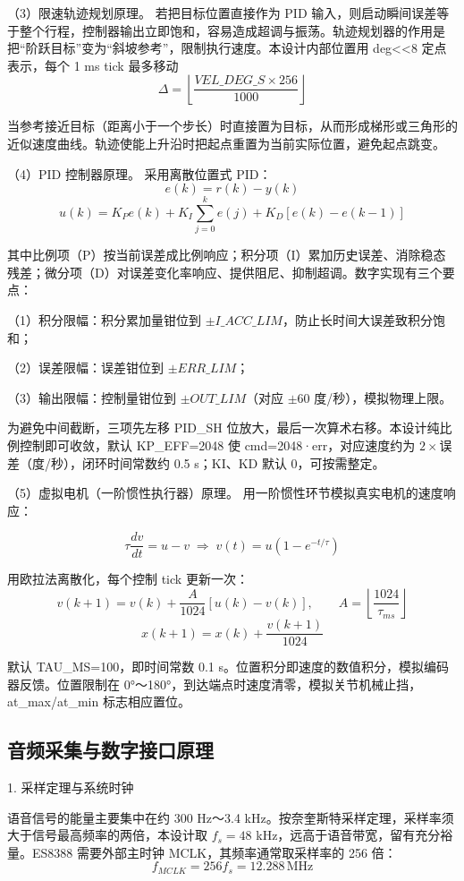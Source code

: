 \documentclass[UTF8,zihao=-4,fontset=windows]{ctexart}
\newcommand{\code}[1]{{\ttfamily #1}}
\newcommand{\subhead}[1]{%
  \par\medskip
  {\heiti\zihao{-4}#1}
  \nopagebreak
  \par\smallskip
}
\begin{document}
{\heiti（3）限速轨迹规划原理。} 若把目标位置直接作为 PID 输入，则启动瞬间误差等于整个行程，控制器输出立即饱和，容易造成超调与振荡。轨迹规划器的作用是把“阶跃目标”变为“斜坡参考”，限制执行速度。本设计内部位置用 \code{deg<<8} 定点表示，每个 1 ms tick 最多移动
\[
\Delta=\left\lfloor\frac{VEL\_DEG\_S\times 256}{1000}\right\rfloor
\]

当参考接近目标（距离小于一个步长）时直接置为目标，从而形成梯形或三角形的近似速度曲线。轨迹使能上升沿时把起点重置为当前实际位置，避免起点跳变。

{\heiti（4）PID 控制器原理。} 采用离散位置式 PID：
\[
e(k)=r(k)-y(k)
\]
\[
u(k)=K_Pe(k)+K_I\sum_{j=0}^{k}e(j)+K_D[e(k)-e(k-1)]
\]

其中比例项（P）按当前误差成比例响应；积分项（I）累加历史误差、消除稳态残差；微分项（D）对误差变化率响应、提供阻尼、抑制超调。数字实现有三个要点：

{\heiti（1）}积分限幅：积分累加量钳位到 $\pm I\_ACC\_LIM$，防止长时间大误差致积分饱和；

{\heiti（2）}误差限幅：误差钳位到 $\pm ERR\_LIM$；

{\heiti（3）}输出限幅：控制量钳位到 $\pm OUT\_LIM$（对应 $\pm 60$ 度/秒），模拟物理上限。

为避免中间截断，三项先左移 \code{PID\_SH} 位放大，最后一次算术右移。本设计纯比例控制即可收敛，默认 \code{KP\_EFF}=2048 使 \code{cmd}=2048·\code{err}，对应速度约为 $2\times$误差（度/秒），闭环时间常数约 0.5 s；\code{KI}、\code{KD} 默认 0，可按需整定。

{\heiti（5）虚拟电机（一阶惯性执行器）原理。} 用一阶惯性环节模拟真实电机的速度响应：

\[
\tau\frac{dv}{dt}=u-v \;\Rightarrow\; v(t)=u\left(1-e^{-t/\tau}\right)
\]

用欧拉法离散化，每个控制 tick 更新一次：
\[
v(k+1)=v(k)+\frac{A}{1024}\left[u(k)-v(k)\right],\qquad A=\left\lfloor\frac{1024}{\tau_{ms}}\right\rfloor
\]
\[
x(k+1)=x(k)+\frac{v(k+1)}{1024}
\]

默认 \code{TAU\_MS}=100，即时间常数 0.1 s。位置积分即速度的数值积分，模拟编码器反馈。位置限制在 0°～180°，到达端点时速度清零，模拟关节机械止挡，\code{at\_max}/\code{at\_min} 标志相应置位。

\subsection{音频采集与数字接口原理}

\subhead{1. 采样定理与系统时钟}

语音信号的能量主要集中在约 300 Hz～3.4 kHz。按奈奎斯特采样定理，采样率须大于信号最高频率的两倍，本设计取 $f_s=48$ kHz，远高于语音带宽，留有充分裕量。ES8388 需要外部主时钟 MCLK，其频率通常取采样率的 256 倍：
\[
f_{MCLK}=256f_s=12.288\,\mathrm{MHz}
\]
\end{document}
